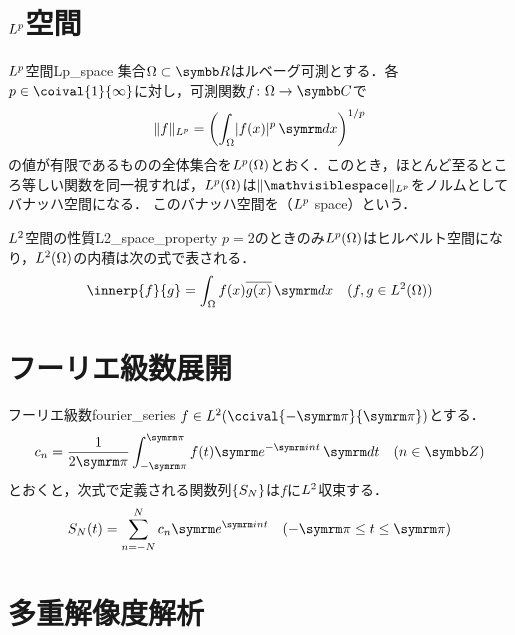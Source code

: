 \documentclass[../../main]{subfiles}
\begin{document}
\section{\texorpdfstring{\(L^p\)}{Lp}空間}
\label{section:lp_space}

\begin{definition}{\(L^p\)空間}{Lp_space}
  集合\(\Omega\subset\numset{R}\)はルベーグ可測とする．各\(p\in\coival{1}{\infty}\)に対し，可測関数\(f\colon\Omega\to\numset{C}\)で
  \[
    \vnorm{f}_{\Lebesgue{p}} = \pqty*{\int_\Omega\abs{f(x)}^p\intd{x}}^{1/p}
  \]
  の値が有限であるものの全体集合を\(L^p(\Omega)\)とおく．このとき，ほとんど至るところ等しい関数を同一視すれば，\(L^p(\Omega)\)は\(\vnorm{\holder}_{\Lebesgue{p}}\)をノルムとしてバナッハ空間になる．
  このバナッハ空間を（\(L^p\) space）という．
\end{definition}

\begin{proposition}{\(L^2\)空間の性質}{L2_space_property}
  \(p=2\)のときのみ\(L^p(\Omega)\)はヒルベルト空間になり，\(L^2(\Omega)\)の内積は次の式で表される．
  \[
    \innerp{f}{g} = \int_\Omega f(x)\conj{g(x)}\intd{x}\quad(f,g\in\Lebesgue{2}(\Omega))
  \]
\end{proposition}

\section{フーリエ級数展開}

\begin{definition}{フーリエ級数}{fourier_series}
  \(f\in\Lebesgue{2}(\ccival{-\krez}{\krez})\)とする．
  \[
    c_n = \frac{1}{2\krez}\int_{-\krez}^{\krez}f(t)\napr^{-\iuni nt}\intd{t}\quad(n\in\numset{Z})
  \]
  とおくと，次式で定義される関数列\(\lbrace S_N\rbrace\)は\(f\)に\(L^2\)収束する．
  \[
    S_N(t) = \sum_{n=-N}^Nc_n\napr^{\iuni nt}\quad(-\krez\leq t\leq\krez)
  \]
\end{definition}

\section{多重解像度解析}
\end{document}

